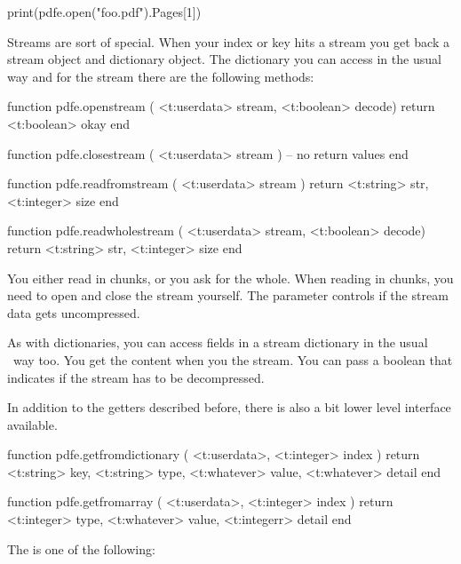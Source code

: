 \starttyping[option=LUA]
print(pdfe.open("foo.pdf").Pages[1])
\stoptyping

\stopsubsection

\startsubsection[title={Streams}]

Streams are sort of special. When your index or key hits a stream you get back a
stream object and dictionary object. The dictionary you can access in the usual
way and for the stream there are the following methods:

\starttyping[option=LUA]
function pdfe.openstream ( <t:userdata> stream, <t:boolean> decode)
    return <t:boolean> okay
end

function pdfe.closestream ( <t:userdata> stream )
    -- no return values
end

function pdfe.readfromstream ( <t:userdata> stream )
    return
        <t:string>  str,
        <t:integer> size
end

function pdfe.readwholestream ( <t:userdata> stream, <t:boolean> decode)
    return
        <t:string>  str,
        <t:integer> size
end
\stoptyping

You either read in chunks, or you ask for the whole. When reading in chunks, you
need to open and close the stream yourself. The  parameter controls
if the stream data gets uncompressed.

As with dictionaries, you can access fields in a stream dictionary in the usual
\LUA\ way too. You get the content when you  the stream. You can
pass a boolean that indicates if the stream has to be decompressed.

\stopsubsection

\startsubsection[title={Low level getters}]

In addition to the getters described before, there is also a bit lower level
interface available.

\starttyping[option=LUA]
function pdfe.getfromdictionary ( <t:userdata>, <t:integer> index )
    return
        <t:string>   key,
        <t:string>   type,
        <t:whatever> value,
        <t:whatever> detail
end

function pdfe.getfromarray ( <t:userdata>, <t:integer> index )
    return
        <t:integer>  type,
        <t:whatever> value,
        <t:integerr> detail
end
\stoptyping

The  is one of the following:

\startfourrows
{}
\stopfourrows

